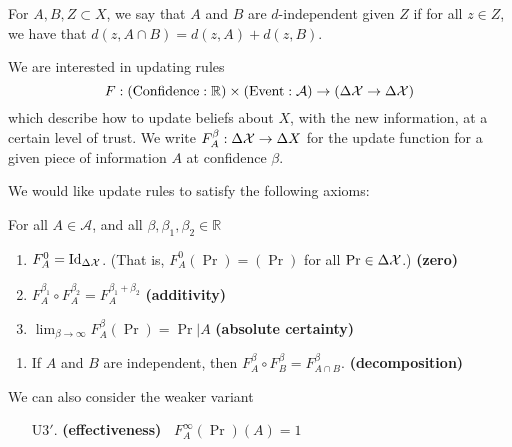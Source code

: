 \documentclass{article}
\DeclareMathOperator{\supp}{\mathrm{Supp}}
\begin{document}
\begin{defn}
For $A,B,Z \subset X$,
we say that $A$ and $B$ are $d$-independent given $Z$ if
for all $z \in Z$, we have that
$d(z, A \cap B) = d(z, A) + d(z,B)$.
\end{defn}

We are interested in updating rules
\[
    F: (\text{Confidence} : \mathbb R) \times (\text{Event} : \mathcal A) \to (\Delta\mathcal X  \to \Delta \mathcal X)
\]
which describe how to update beliefs about $X$, with the new information, at a certain level of trust. We write $F^\beta_A : \Delta\mathcal X \to \Delta X$ for the update function for a given piece of information $A$ at confidence $\beta$.

We would like update rules to satisfy the following axioms:

For all $A \in \mathcal A$, and all $\beta,\beta_1, \beta_2 \in \mathbb R$
\begin{enumerate}[label=UR\arabic{*}.,nosep]
    \item  $F^{0}_A  =  \mathrm{Id}_{\Delta\mathcal X}$. (That is, $F^{0}_A(\Pr) = (\Pr)$ for all $\Pr \in \Delta\mathcal X$.)
        \hfill \textbf{(zero)}
    \item $F^{\beta_1}_A \circ F^{\beta_2}_A = F^{\beta_1 + \beta_2}_A$
        \hfill \textbf{(additivity)}
    \item $\displaystyle \lim_{\beta\to\infty} F^\beta_A (\Pr) = \Pr|A$
        \hfill \textbf{(absolute certainty)}
\end{enumerate}

\begin{enumerate}[resume,label=UR\arabic{*}.]
    \item If $A$ and $B$ are independent, then $F^{\beta}_A \circ F^{\beta}_B = F^{\beta}_{A \cap B}$.
        \hfill \textbf{(decomposition)}
\end{enumerate}

We can also consider the weaker variant
\begin{enumerate}
    \item[U3$'$.]  \textbf{(effectiveness)~} $F^\infty_A (\Pr)(A) = 1$

\end{enumerate}
\end{document}
